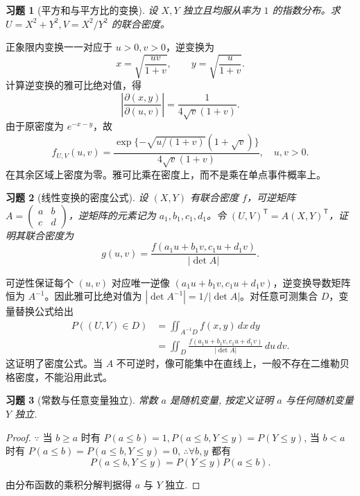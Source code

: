 \documentclass[UTF8,12pt,a4paper,fontset=fandol]{ctexart}
\newtheorem{exercise}{习题}[section]
\begin{document}
\begin{exercise}[平方和与平方比的变换]\label{q:Y4.34}
设 $X,Y$ 独立且均服从率为 $1$ 的指数分布。求 $U=X^2+Y^2,V=X^2/Y^2$ 的联合密度。\par{}
\end{exercise}

\begin{solve}\label{a:Y4.34}正象限内变换一一对应于 $u>0,v>0$，逆变换为\[x=\sqrt{\frac{uv}{1+v}},\qquad y=\sqrt{\frac{u}{1+v}}.\]计算逆变换的雅可比绝对值，得\[\left|\frac{\partial(x,y)}{\partial(u,v)}\right|=\frac{1}{4\sqrt v(1+v)}.\]由于原密度为 $e^{-x-y}$，故\[f_{U,V}(u,v)=\frac{\exp\{-\sqrt{u/(1+v)}(1+\sqrt v)\}}{4\sqrt v(1+v)},\quad u,v>0.\]在其余区域上密度为零。雅可比乘在密度上，而不是乘在单点事件概率上。\end{solve}

\begin{exercise}[线性变换的密度公式]\label{q:Y4.36}
设 $(X,Y)$ 有联合密度 $f$，可逆矩阵 $A=\begin{pmatrix}a&b\\c&d\end{pmatrix}$，逆矩阵的元素记为 $a_1,b_1,c_1,d_1$。令 $(U,V)^\mathsf T=A(X,Y)^\mathsf T$，证明其联合密度为\[g(u,v)=\frac{f(a_1u+b_1v,c_1u+d_1v)}{|\det A|}.\]\par{}
\end{exercise}

\begin{solve}\label{a:Y4.36}可逆性保证每个 $(u,v)$ 对应唯一逆像 $(a_1u+b_1v,c_1u+d_1v)$，逆变换导数矩阵恒为 $A^{-1}$。因此雅可比绝对值为 $|\det A^{-1}|=1/|\det A|$。对任意可测集合 $D$，变量替换公式给出\[\begin{aligned}P((U,V)\in D)&=\iint_{A^{-1}D}f(x,y)\,dx\,dy\\&=\iint_D\frac{f(a_1u+b_1v,c_1u+d_1v)}{|\det A|}\,du\,dv.\end{aligned}\]这证明了密度公式。当 $A$ 不可逆时，像可能集中在直线上，一般不存在二维勒贝格密度，不能沿用此式。\end{solve}

\begin{exercise}[常数与任意变量独立]\label{q:A4.4}
常数 $a$ 是随机变量, 按定义证明 $a$ 与任何随机变量 $Y$ 独立.\par{}
\end{exercise}

\begin{proof}\label{a:A4.4}
    $\because$ 当 $b\geq a$ 时有 $P(a\leq b)=1,P(a\leq b,Y\leq y)=P(Y\leq y)$, 当 $b<a$ 时有 $P(a\leq b)=P(a\leq b,Y\leq y)=0$, $\therefore\forall b,y$ 都有
    \[P(a\leq b,Y\leq y)=P(Y\leq y)P(a\leq b).\]

    由分布函数的乘积分解判据得 $a$ 与 $Y$ 独立.
\end{proof}
\end{document}
